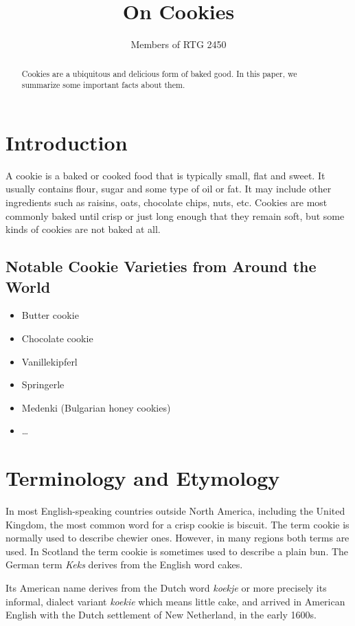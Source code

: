 \documentclass[a4paper]{article}
\title{On Cookies}
\author{Members of RTG 2450}
\begin{document}
\maketitle

\begin{abstract}
	Cookies are a ubiquitous and delicious form of baked good. 
	In this paper, we summarize some important facts about them.
\end{abstract}

\section{Introduction}
A cookie is a baked or cooked food that is typically small, flat and sweet. 
It usually contains flour, sugar and some type of oil or fat. 
It may include other ingredients such as raisins, oats, chocolate chips, nuts, etc. 
Cookies are most commonly baked until crisp or just long enough that they remain soft, but some kinds of cookies are not baked at all.

\subsection{Notable Cookie Varieties from Around the World}
\begin{itemize}
	\item Butter cookie
	\item Chocolate cookie
	\item Vanillekipferl
	\item Springerle
	\item Medenki (Bulgarian honey cookies)
	\item \dots
\end{itemize}

\section{Terminology and Etymology}
In most English-speaking countries outside North America, including the United Kingdom, the most common word for a crisp cookie is biscuit. 
The term cookie is normally used to describe chewier ones. 
However, in many regions both terms are used. 
In Scotland the term cookie is sometimes used to describe a plain bun. 
The German term \textit{Keks} derives from the English word cakes.

Its American name derives from the Dutch word \textit{koekje} or more precisely its informal, dialect variant \textit{koekie} which means little cake, and arrived in American English with the Dutch settlement of New Netherland, in the early 1600s.
\end{document}
